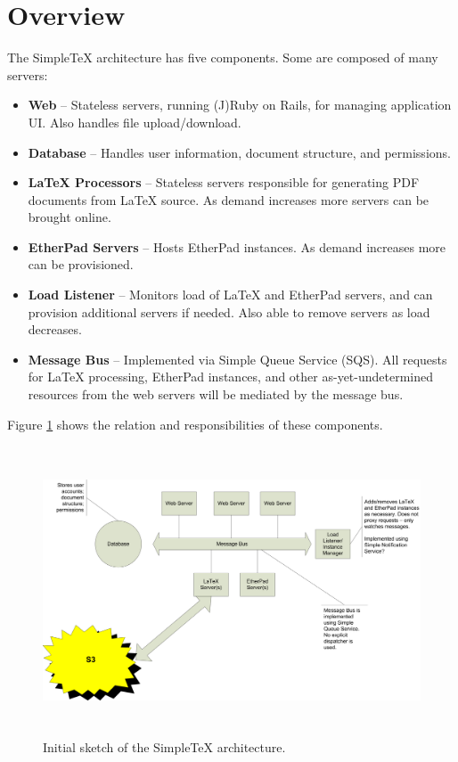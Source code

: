 \documentclass[11pt]{article}
\newcommand\STex{Simple\TeX\xspace}
\newcommand\LTex{\LaTeX\xspace}
\begin{document}
\thispagestyle{first}
\section*{Overview}
The \STex architecture has five components. Some are composed of many servers:
\begin{itemize}
\item \textbf{Web} -- Stateless servers, running (J)Ruby on Rails, for managing application UI. Also handles file upload/download.
\item \textbf{Database} -- Handles user information, document structure, and permissions.
\item \textbf{\LTex Processors} -- Stateless servers responsible for generating PDF documents from \LTex source. As demand increases more servers can be brought online.
\item \textbf{EtherPad Servers} -- Hosts EtherPad instances. As demand increases more can be provisioned.
\item \textbf{Load Listener} -- Monitors load of \LTex and EtherPad servers, and can provision additional servers if needed. Also able to remove servers as load decreases.
\item \textbf{Message Bus} -- Implemented via Simple Queue Service (SQS). All requests for \LTex processing, EtherPad instances, and other as-yet-undetermined resources from the web servers will be mediated by the message bus.
\end{itemize}
\noindent
Figure \ref{fig_arch} shows the relation and responsibilities of these components.

\begin{figure}[h]
\centering
\includegraphics[width=6in,height=3.3738in]{SimpleTexArchitectureDiagram}
\caption{Initial sketch of the \STex architecture.}
\label{fig_arch}
\end{figure}
\end{document}
